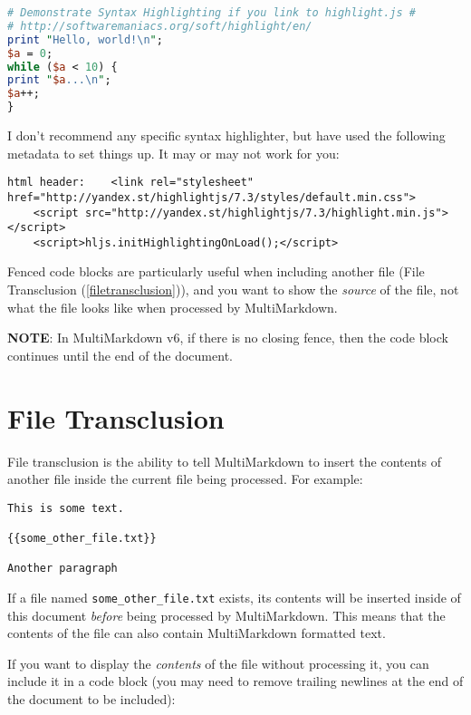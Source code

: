 \begin{lstlisting}[language=perl]
# Demonstrate Syntax Highlighting if you link to highlight.js #
# http://softwaremaniacs.org/soft/highlight/en/
print "Hello, world!\n";
$a = 0;
while ($a < 10) {
print "$a...\n";
$a++;
}
\end{lstlisting}

I don't recommend any specific syntax highlighter, but have used the following metadata to set things up. It may or may not work for you:

\begin{verbatim}
html header:	<link rel="stylesheet" href="http://yandex.st/highlightjs/7.3/styles/default.min.css">
	<script src="http://yandex.st/highlightjs/7.3/highlight.min.js"></script>
	<script>hljs.initHighlightingOnLoad();</script>
\end{verbatim}

Fenced code blocks are particularly useful when including another file (File Transclusion (\autoref{filetransclusion})), and you want to show the \emph{source} of the file, not what the file looks like when processed by MultiMarkdown.

\textbf{NOTE}: In MultiMarkdown v6, if there is no closing fence, then the code block continues until the end of the document.

\section{File Transclusion}
\label{filetransclusion}

File transclusion is the ability to tell MultiMarkdown to insert the contents of another file inside the current file being processed. For example:

\begin{verbatim}
This is some text.

{{some_other_file.txt}}

Another paragraph
\end{verbatim}

If a file named \texttt{some\_other\_file.txt} exists, its contents will be inserted inside of this document \emph{before} being processed by MultiMarkdown. This means that the contents of the file can also contain MultiMarkdown formatted text.

If you want to display the \emph{contents} of the file without processing it, you can include it in a code block (you may need to remove trailing newlines at the end of the document to be included):

